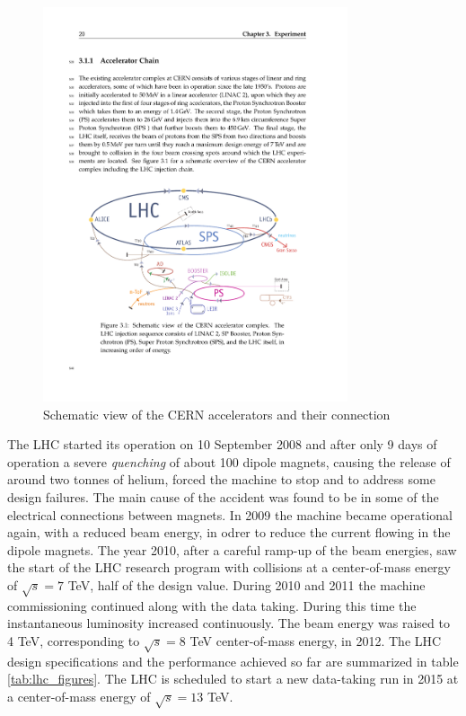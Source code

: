 \begin{figure}
\begin{center}
\includegraphics[angle=-0,width=0.8\textwidth]{2_LHC_and_CMS/pics/LHC.pdf}
\caption{Schematic view of the CERN accelerators and their connection
\label{fig:cern_accelerators}
}
\end{center}
\end{figure}

The LHC started its operation on 10 September 2008 and after only 9 days of operation a severe \emph{quenching} of about 100 dipole magnets, causing the release of around two tonnes of helium, forced the machine to stop and to address some design failures. The main cause of the accident was found to be in some of the electrical connections between magnets. In 2009 the machine became operational again, with a reduced beam energy, in odrer to reduce the current flowing in the dipole magnets. The year 2010, after a careful ramp-up of the beam energies, saw the start of the LHC research program with collisions at a center-of-mass energy of $\sqrt{s} = 7$ TeV, half of the design value. During 2010 and 2011 the machine commissioning continued along with the data taking. During this time the instantaneous luminosity increased continuously. The beam energy was raised to 4 TeV, corresponding to $\sqrt{s} = 8$ TeV center-of-mass energy, in 2012. The LHC design specifications and the performance achieved so far are summarized in table \ref{tab:lhc_figures}. The LHC is scheduled to start a new data-taking run in 2015 at a center-of-mass energy of $\sqrt{s} = 13$ TeV.

